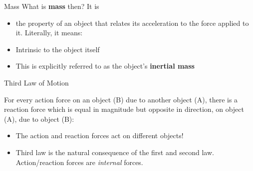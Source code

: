 \documentclass[12pt,compress,aspectratio=169]{beamer}
\newcommand{\eq}[2]{\vspace{#1}{\Large\begin{displaymath}#2\end{displaymath}}}
\begin{document}
\begin{frame}{Mass}
  What is \textbf{mass} then? It is
  \begin{itemize}
    \item the property of an object that relates its acceleration to the force
      applied to it. Literally, it means:

      \eq{-.2in}{
        m\equiv\frac{F_\text{net}}{a}
      }
    \item Intrinsic to the object itself
    \item This is explicitly referred to as the object's \textbf{inertial mass}
  \end{itemize}
\end{frame}



\begin{frame}{Third Law of Motion}
  \begin{center}
  \end{center}
  For every action force on an object (B) due to another object
  (A), there is a reaction force which is equal in magnitude but opposite in
  direction, on object (A), due to object (B):

  \eq{-.3in}{
    \boxed{\bm{F}_\text{AB} = -\bm{F}_\text{BA}}
  }
  \begin{itemize}
  \item The action and reaction forces act on different objects!
  \item Third law is the natural consequence of the first and second law.
    Action/reaction forces are \emph{internal} forces.
  \end{itemize}
  \vspace{.2in}
\end{frame}
\end{document}
